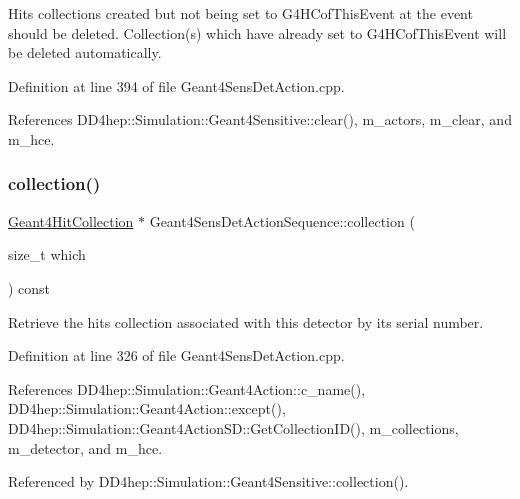 Hits collections created but not being set to G4\+H\+Cof\+This\+Event at the event should be deleted. Collection(s) which have already set to G4\+H\+Cof\+This\+Event will be deleted automatically. 

Definition at line 394 of file Geant4\+Sens\+Det\+Action.\+cpp.



References D\+D4hep\+::\+Simulation\+::\+Geant4\+Sensitive\+::clear(), m\+\_\+actors, m\+\_\+clear, and m\+\_\+hce.

\hypertarget{class_d_d4hep_1_1_simulation_1_1_geant4_sens_det_action_sequence_ae8f783b4958cb90097b5735e5351591e}{}\label{class_d_d4hep_1_1_simulation_1_1_geant4_sens_det_action_sequence_ae8f783b4958cb90097b5735e5351591e} 
\subsubsection{\texorpdfstring{collection()}{collection()}}
{\footnotesize\ttfamily \hyperlink{class_d_d4hep_1_1_simulation_1_1_geant4_hit_collection}{Geant4\+Hit\+Collection} $\ast$ Geant4\+Sens\+Det\+Action\+Sequence\+::collection (\begin{DoxyParamCaption}\item[{size\+\_\+t}]{which }\end{DoxyParamCaption}) const}



Retrieve the hits collection associated with this detector by its serial number. 



Definition at line 326 of file Geant4\+Sens\+Det\+Action.\+cpp.



References D\+D4hep\+::\+Simulation\+::\+Geant4\+Action\+::c\+\_\+name(), D\+D4hep\+::\+Simulation\+::\+Geant4\+Action\+::except(), D\+D4hep\+::\+Simulation\+::\+Geant4\+Action\+S\+D\+::\+Get\+Collection\+I\+D(), m\+\_\+collections, m\+\_\+detector, and m\+\_\+hce.



Referenced by D\+D4hep\+::\+Simulation\+::\+Geant4\+Sensitive\+::collection().

\hypertarget{class_d_d4hep_1_1_simulation_1_1_geant4_sens_det_action_sequence_a51a324ce960e144da1f1a16a8c18f6f1}{}\label{class_d_d4hep_1_1_simulation_1_1_geant4_sens_det_action_sequence_a51a324ce960e144da1f1a16a8c18f6f1} 
